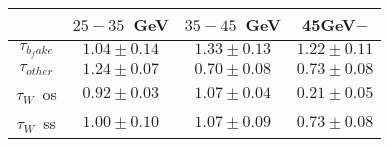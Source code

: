 \centering
\begin{tabular}{|c|c|c|c|} \hline
 & $25-35$~GeV & $35-45$~GeV & 45GeV$-$\\\hline
$\tau_{b_fake}$ & $1.04\pm0.14$ & $1.33\pm0.13$ & $1.22\pm0.11$\\\hline
$\tau_{other}$ & $1.24\pm0.07$ & $0.70\pm0.08$ & $0.73\pm0.08$\\\hline
$\tau_{W}$~os & $0.92\pm0.03$ & $1.07\pm0.04$ & $0.21\pm0.05$\\\hline
$\tau_{W}$~ss & $1.00\pm0.10$ & $1.07\pm0.09$ & $0.73\pm0.08$\\\hline
\end{tabular}

